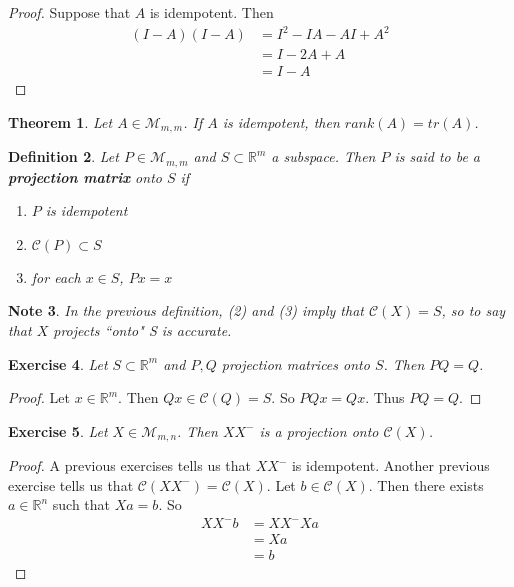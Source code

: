\documentclass[12pt]{amsart}
\newtheorem{thm}{Theorem}[section]
\newtheorem{defn}[thm]{Definition}
\newtheorem{note}[thm]{Note}
\newtheorem{ex}[thm]{Exercise}
\newcommand{\R}{\mathbb{R}}
\newcommand{\MC}{\mathcal{C}}
\newcommand{\MM}{\mathcal{M}}
\newcommand{\z}[1]{Let ${#1} \in \MM_{m,n}$}
\begin{document}
\begin{proof} 
Suppose that $A$ is idempotent. Then
\begin{align*}
(I-A)(I-A) 
&= I^2 -IA -AI + A^2 \\
&= I -2A +A \\
&= I -A
\end{align*}
\end{proof}

\begin{thm}
Let $A \in \MM_{m,m}$. If $A$ is idempotent, then $rank(A) = tr(A)$.
\end{thm}

\begin{defn}
Let $P \in \MM_{m,m}$ and $S \subset \R^m$ a subspace. Then $P$ is said to be a \textbf{projection matrix} onto $S$ if 
\begin{enumerate}
\item $P$ is idempotent
\item $\MC(P) \subset S$ 
\item for each $x \in S$, $Px = x$
\end{enumerate} 
\end{defn}

\begin{note}
In the previous definition, (2) and (3) imply that $\MC(X) = S$, so to say that $X$ projects ``onto" S is accurate.
\end{note}

\begin{ex}
Let $S \subset \R^m$ and $P,Q$ projection matrices onto $S$. Then $PQ = Q$. 
\end{ex}

\begin{proof}
Let $x \in \R^m$. Then $Qx \in \MC(Q) = S$. So $PQx = Qx$. Thus $PQ = Q$.
\end{proof}

\begin{ex}
\z{X}. Then $XX^-$ is a projection onto $\MC(X)$.
\end{ex}

\begin{proof}
A previous exercises tells us that $XX^-$ is idempotent. Another previous exercise tells us that $\MC(XX^-) = \MC(X)$. Let $b \in \MC(X)$. Then there exists $a \in \R^n$ such that $Xa =b$. So 
\begin{align*}
XX^-b
&= XX^- Xa\\ 
&= Xa\\
&= b
\end{align*}
\end{proof}
\end{document}
